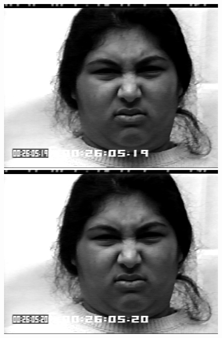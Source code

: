 \documentclass[12pt, a4paper]{report}
\begin{document}
\begin{figure}[h]
\begin{minipage}[b]{.2\linewidth}
		\includegraphics[width=\linewidth]{Bilder/Disgust7.png}
	\end{minipage}
	\hspace{.025\linewidth}%
	\begin{minipage}[b]{.2\linewidth} %
		\includegraphics[width=\linewidth]{Bilder/Disgust8.png}
	\end{minipage} 
	\newline
	\begin{minipage}[b]{.2\linewidth} %

\end{minipage}
\end{figure}
\end{document}
